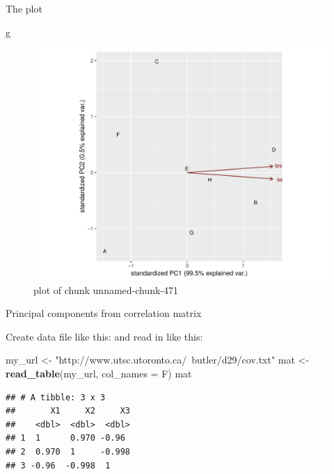 \documentclass[ignorenonframetext,]{beamer}
\newenvironment{Shaded}{\begin{snugshade}}{\end{snugshade}}
\newcommand{\DataTypeTok}[1]{\textcolor[rgb]{0.13,0.29,0.53}{#1}}
\newcommand{\KeywordTok}[1]{\textcolor[rgb]{0.13,0.29,0.53}{\textbf{#1}}}
\newcommand{\NormalTok}[1]{#1}
\newcommand{\StringTok}[1]{\textcolor[rgb]{0.31,0.60,0.02}{#1}}
\begin{document}
\begin{frame}[fragile]{The plot}
\protect\hypertarget{the-plot-10}{}

\begin{Shaded}
\begin{Highlighting}[]
\NormalTok{g}
\end{Highlighting}
\end{Shaded}

\begin{figure}
\centering
\includegraphics{figure/unnamed-chunk-471-1.pdf}
\caption{plot of chunk unnamed-chunk-471}
\end{figure}

\end{frame}

\begin{frame}[fragile]{Principal components from correlation matrix}
\protect\hypertarget{principal-components-from-correlation-matrix}{}

Create data file like this:  and read in like
this:

\begin{Shaded}
\begin{Highlighting}[]
\NormalTok{my_url <-}\StringTok{ "http://www.utsc.utoronto.ca/~butler/d29/cov.txt"}
\NormalTok{mat <-}\StringTok{ }\KeywordTok{read_table}\NormalTok{(my_url, }\DataTypeTok{col_names =}\NormalTok{ F)}
\NormalTok{mat}
\end{Highlighting}
\end{Shaded}

\begin{verbatim}
## # A tibble: 3 x 3
##       X1     X2     X3
##    <dbl>  <dbl>  <dbl>
## 1  1      0.970 -0.96 
## 2  0.970  1     -0.998
## 3 -0.96  -0.998  1
\end{verbatim}

\end{frame}
\end{document}

